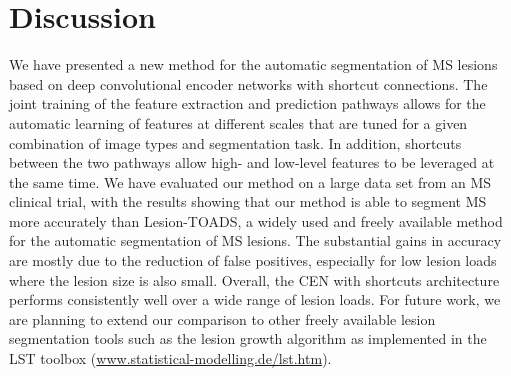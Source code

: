 \section{Discussion}


We have presented a new method for the automatic segmentation of MS lesions
based on deep convolutional encoder networks with shortcut connections.
The joint training of the feature extraction and prediction pathways allows for
the automatic learning of features at different scales that are tuned for a
given combination of image types and segmentation task. In addition, shortcuts
between the two pathways allow high- and low-level features to be leveraged at
the same time. We have evaluated our method on a large data set from an MS
clinical trial, with the results showing that our method is able to segment MS
%
more accurately than
%
Lesion-TOADS, a widely used and freely available
method for the automatic segmentation of MS lesions.
The substantial gains in accuracy
are mostly due to the
 reduction of false positives, especially for low lesion loads where the lesion
size is also small. Overall, the CEN with shortcuts architecture performs
consistently well over a wide range of lesion loads. For future work, we are
planning to extend our comparison to other freely available lesion segmentation
tools such as the lesion growth algorithm \cite{schmidt2012automated} as
implemented in the LST toolbox (\url{www.statistical-modelling.de/lst.htm}).

